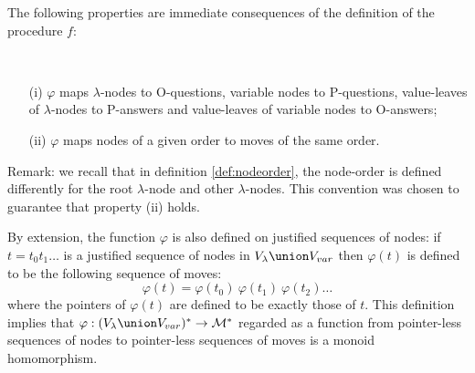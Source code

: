 The following properties are immediate consequences of the definition of the procedure $f$:
\begin{property} \
\label{proper:phi_conserve_order}
\begin{itemize}
\item[(i)] $\varphi$ maps $\lambda$-nodes to O-questions, variable nodes to
P-questions, value-leaves of $\lambda$-nodes to P-answers and
value-leaves of variable nodes to O-answers;
\item[(ii)] $\varphi$ maps nodes of a given order to moves of the same order.
\end{itemize}
\end{property}
Remark: we recall that in definition \ref{def:nodeorder}, the
node-order is defined differently for the root $\lambda$-node and
other $\lambda$-nodes. This convention was chosen to guarantee that
property (ii) holds.

By extension, the function $\varphi$ is also defined on justified
sequences of nodes: if $t = t_0 t_1 \ldots$ is a justified sequence
of nodes in $V_\lambda \union V_{var}$ then $\varphi(t)$ is defined
to be the following sequence of moves:
$$\varphi(t) = \varphi(t_0)\ \varphi(t_1)\  \varphi(t_2) \ldots$$
where the pointers of $\varphi(t)$ are defined to be exactly those
of $t$. This definition implies that $\varphi : (V_\lambda \union
V_{var})^* \rightarrow \mathcal{M}^*$ regarded as a function from
pointer-less sequences of nodes to pointer-less sequences of moves
is a monoid homomorphism.

